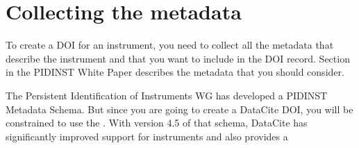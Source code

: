 \documentclass[a4paper,10pt,english]{sphinxmanual}
\begin{document}
\section{Collecting the metadata}
\label{\detokenize{datacite-cookbook/metadata:collecting-the-metadata}}\label{\detokenize{datacite-cookbook/metadata::doc}}
\sphinxAtStartPar
To create a DOI for an instrument, you need to collect all the
metadata that describe the instrument and that you want to include in
the DOI record.  Section {\hyperref[\detokenize{white-paper/metadata-schema:pidinst-metadata-schema}]{}} in the PIDINST
White Paper describes the metadata that you should consider.

\sphinxAtStartPar
The Persistent Identification of Instruments WG has developed a
PIDINST Metadata Schema.  But since you are going to create a DataCite
DOI, you will be constrained to use the .
With version 4.5 of that schema, DataCite has significantly improved
support for instruments and also provides a 
\end{document}
